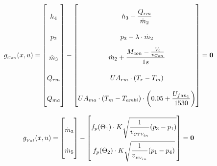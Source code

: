 
\begin{equation} \label{eq:Gcondenser}\renewcommand{\arraystretch}{2.5}
	g_{_{Con}}(x,u) =  \begin{bmatrix}
		h_{4}				\\ %
		p_{2}				\\ %
		\dot{m}_{3}			\\ %
		Q_{rm}				\\
		Q_{ma}				\\
	\end{bmatrix}
	-
	\begin{bmatrix}
		h_{3} - \dfrac{Q_{rm}}{\dot{m}_{2}}                                              \\ %
		p_{3} - \lambda \cdot \dot{m}_{2}                                                \\ %
		\dot{m}_{2} + \dfrac{M_{con} - \frac{V_i}{v_{Con}}}{1s}                          \\ %
		U A_{rm} \cdot (T_r - T_m)                                                       \\
		U A_{ma} \cdot (T_m - T_{ambi})\cdot \left(0.05 + \dfrac{U_{fan_1}}{1530}\right)
	\end{bmatrix}
	=\textbf{0}
\end{equation}




\begin{equation} \label{eq:Gvalves}\renewcommand{\arraystretch}{2.5}
	g_{_{Val}}(x,u) =  \begin{bmatrix}
		\dot{m}_{3}			\\ %
		\dot{m}_{5}			\\ %
	\end{bmatrix}
	-
	\begin{bmatrix}
		f_p(\Theta_1) \cdot K  \sqrt{\dfrac{1}{v_{_{CTV_{in}}}} (p_{3} - p_{1})}\\		%
		f_p(\Theta_2) \cdot K  \sqrt{\dfrac{1}{v_{_{EV_{in}}}} (p_{1} - p_{4})}\\			%
	\end{bmatrix}
	=\textbf{0}
\end{equation}



